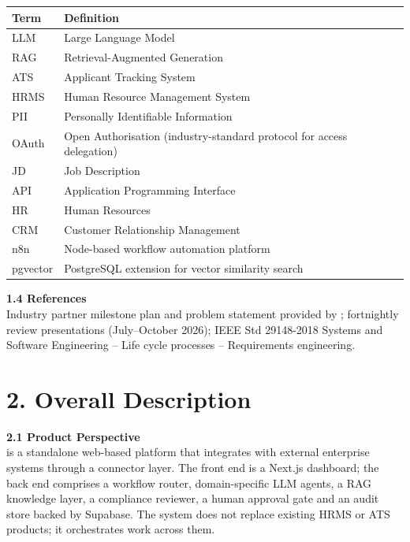 \renewcommand{\arraystretch}{1.15}
\noindent\begin{tabular}{|p{}|p{}|}
\hline
\textbf{Term} & \textbf{Definition} \\ \hline
LLM & Large Language Model \\ \hline
RAG & Retrieval-Augmented Generation \\ \hline
ATS & Applicant Tracking System \\ \hline
HRMS & Human Resource Management System \\ \hline
PII & Personally Identifiable Information \\ \hline
OAuth & Open Authorisation (industry-standard protocol for access delegation) \\ \hline
JD & Job Description \\ \hline
API & Application Programming Interface \\ \hline
HR & Human Resources \\ \hline
CRM & Customer Relationship Management \\ \hline
n8n & Node-based workflow automation platform \\ \hline
pgvector & PostgreSQL extension for vector similarity search \\ \hline
\end{tabular}

\vspace{8pt}
\noindent\textbf{1.4 References}\\
Industry partner milestone plan and problem statement provided by \Partner{}; fortnightly review presentations (July--October 2026); IEEE Std 29148-2018 Systems and Software Engineering -- Life cycle processes -- Requirements engineering.

\vspace{16pt}
\section*{2. Overall Description}

\noindent\textbf{2.1 Product Perspective}\\
\ProjectTitle{} is a standalone web-based platform that integrates with external enterprise systems through a connector layer. The front end is a Next.js dashboard; the back end comprises a workflow router, domain-specific LLM agents, a RAG knowledge layer, a compliance reviewer, a human approval gate and an audit store backed by Supabase. The system does not replace existing HRMS or ATS products; it orchestrates work across them.

